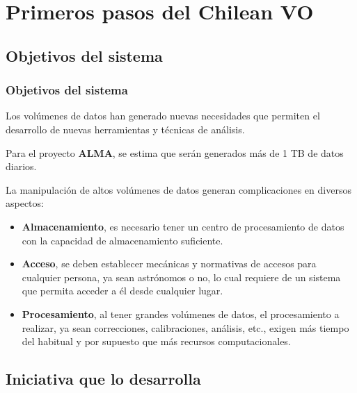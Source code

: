 \section{Primeros pasos del Chilean VO}

\subsection{Objetivos del sistema}

\begin{frame}
\frametitle{Objetivos del sistema}
\begin{multicols}{2}
Los volúmenes de datos han generado nuevas necesidades que
permiten el desarrollo de nuevas herramientas y técnicas de análisis.

Para el proyecto \textbf{ALMA}, se estima que serán generados más de 1 TB de
datos diarios.

La manipulación de altos volúmenes de datos generan complicaciones en diversos
aspectos:
\begin{itemize}
    \item \textbf{Almacenamiento}, es necesario tener un centro de procesamiento de datos con
        la capacidad de almacenamiento suficiente.\\
    \item \textbf{Acceso}, se deben establecer mecánicas y normativas de accesos para
        cualquier persona, ya sean astrónomos o no, lo cual requiere de un sistema que
        permita acceder a él desde cualquier lugar. \\
    \item \textbf{Procesamiento}, al tener grandes volúmenes de datos, el procesamiento a
        realizar, ya sean correcciones, calibraciones, análisis, etc., exigen más tiempo
        del habitual y por supuesto que más recursos computacionales.\\
\end{itemize}

\end{multicols}
\end{frame}

\subsection{Iniciativa que lo desarrolla}


